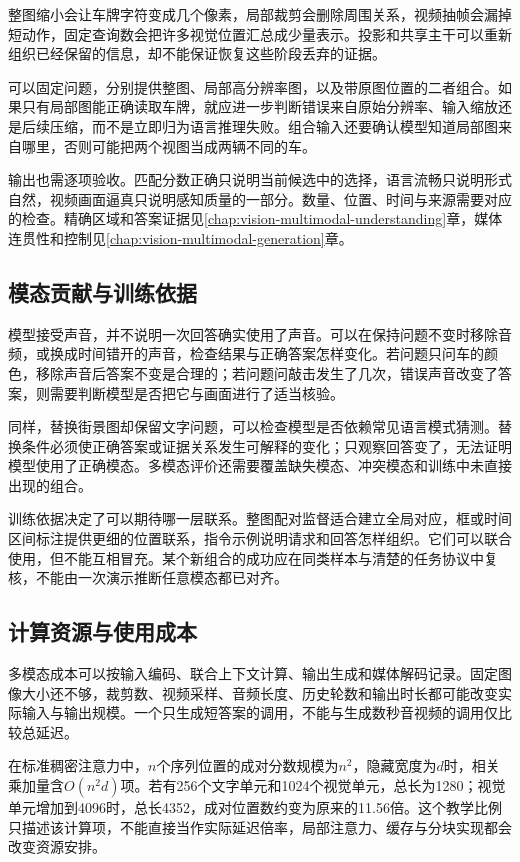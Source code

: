 整图缩小会让车牌字符变成几个像素，局部裁剪会删除周围关系，视频抽帧会漏掉短动作，固定查询数会把许多视觉位置汇总成少量表示。投影和共享主干可以重新组织已经保留的信息，却不能保证恢复这些阶段丢弃的证据。

可以固定问题，分别提供整图、局部高分辨率图，以及带原图位置的二者组合。如果只有局部图能正确读取车牌，就应进一步判断错误来自原始分辨率、输入缩放还是后续压缩，而不是立即归为语言推理失败。组合输入还要确认模型知道局部图来自哪里，否则可能把两个视图当成两辆不同的车。

输出也需逐项验收。匹配分数正确只说明当前候选中的选择，语言流畅只说明形式自然，视频画面逼真只说明感知质量的一部分。数量、位置、时间与来源需要对应的检查。精确区域和答案证据见\ref{chap:vision-multimodal-understanding}章，媒体连贯性和控制见\ref{chap:vision-multimodal-generation}章。

\subsection{模态贡献与训练依据}
\label{sec:vision-models-modality-contribution}

模型接受声音，并不说明一次回答确实使用了声音。可以在保持问题不变时移除音频，或换成时间错开的声音，检查结果与正确答案怎样变化。若问题只问车的颜色，移除声音后答案不变是合理的；若问题问敲击发生了几次，错误声音改变了答案，则需要判断模型是否把它与画面进行了适当核验。

同样，替换街景图却保留文字问题，可以检查模型是否依赖常见语言模式猜测。替换条件必须使正确答案或证据关系发生可解释的变化；只观察回答变了，无法证明模型使用了正确模态。多模态评价还需要覆盖缺失模态、冲突模态和训练中未直接出现的组合。

训练依据决定了可以期待哪一层联系。整图配对监督适合建立全局对应，框或时间区间标注提供更细的位置联系，指令示例说明请求和回答怎样组织。它们可以联合使用，但不能互相冒充。某个新组合的成功应在同类样本与清楚的任务协议中复核，不能由一次演示推断任意模态都已对齐。

\subsection{计算资源与使用成本}
\label{sec:vision-models-cost}

多模态成本可以按输入编码、联合上下文计算、输出生成和媒体解码记录。固定图像大小还不够，裁剪数、视频采样、音频长度、历史轮数和输出时长都可能改变实际输入与输出规模。一个只生成短答案的调用，不能与生成数秒音视频的调用仅比较总延迟。

在标准稠密注意力中，$n$个序列位置的成对分数规模为$n^2$，隐藏宽度为$d$时，相关乘加量含$O(n^2d)$项。若有256个文字单元和1024个视觉单元，总长为1280；视觉单元增加到4096时，总长4352，成对位置数约变为原来的11.56倍。这个教学比例只描述该计算项，不能直接当作实际延迟倍率，局部注意力、缓存与分块实现都会改变资源安排。

